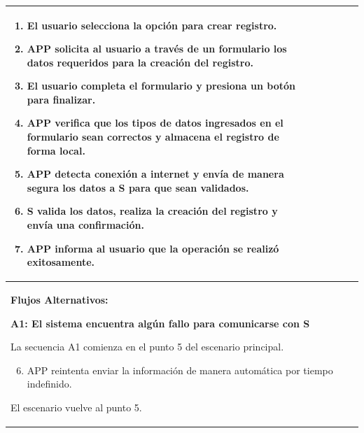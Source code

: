 \begin{longtable}{|l|p{5.5cm}|l|p{2cm}|l|p{1.9cm}|}
{				\begin{enumerate}
					\item El usuario selecciona la opción para crear registro.
					\item APP solicita al usuario a través de un formulario los datos requeridos para la creación del registro.
					\item El usuario completa el formulario y presiona un botón para finalizar.
					\item APP verifica que los tipos de datos ingresados en el formulario sean correctos y almacena el registro de forma local.
					\item APP detecta conexión a internet y envía de manera segura los datos a S para que sean validados.
					\item S valida los datos, realiza la creación del registro y envía una confirmación.
					\item APP informa al usuario que la operación se realizó exitosamente.
				\end{enumerate}

				} \\ \hline

				\multicolumn{6}{|p{15cm}|}{ \textbf{Flujos Alternativos: }

				\textbf{A1: El sistema encuentra algún fallo para comunicarse con S}
				
				La secuencia A1 comienza en el punto 5 del escenario principal.
				\begin{enumerate}
						\setcounter{enumi}{5}
						\item APP reintenta enviar la información de manera automática por tiempo indefinido.
				\end{enumerate}

				El escenario vuelve al punto 5.

				} \\ \hline

			\end{longtable}

